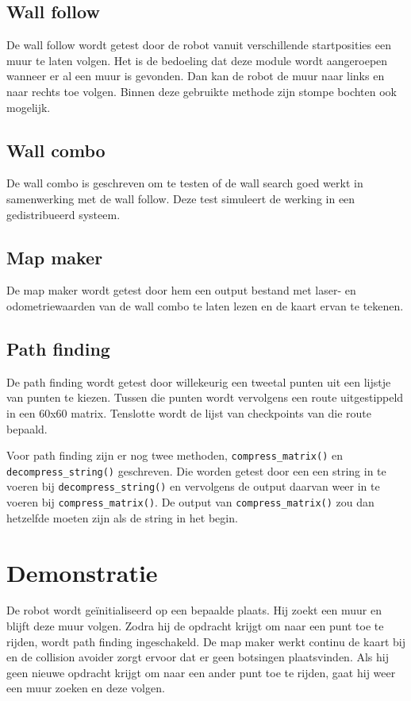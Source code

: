 \documentclass[a4paper,10pt]{article}
\begin{document}
\subsection{Wall follow}
De wall follow wordt getest door de robot vanuit verschillende startposities een muur te laten volgen. Het is de bedoeling dat deze module wordt aangeroepen wanneer er al een muur is gevonden. Dan kan de robot de muur naar links en naar rechts toe volgen. Binnen deze gebruikte methode zijn stompe bochten ook mogelijk.

\subsection{Wall combo}
De wall combo is geschreven om te testen of de wall search goed werkt in samenwerking met de wall follow. Deze test simuleert
de werking in een gedistribueerd systeem.

\subsection{Map maker}
De map maker wordt getest door hem een output bestand met laser- en odometriewaarden van de wall combo te laten lezen en de kaart ervan te tekenen.

\subsection{Path finding}
De path finding wordt getest door willekeurig een tweetal punten uit een lijstje van punten te kiezen. Tussen die punten wordt vervolgens een route uitgestippeld in een 60x60 matrix. Tenslotte wordt de lijst van checkpoints van die route bepaald.

Voor path finding zijn er nog twee methoden, \verb!compress_matrix()! en\\ \verb!decompress_string()! geschreven. Die worden getest door een een string in te voeren bij \verb!decompress_string()! en vervolgens de output daarvan weer in te voeren bij \verb!compress_matrix()!. De output van \verb!compress_matrix()! zou dan hetzelfde moeten zijn als de string in het begin.

\section{Demonstratie}
De robot wordt ge\"{i}nitialiseerd op een bepaalde plaats. Hij zoekt een muur en blijft deze muur volgen. Zodra hij de opdracht krijgt om naar een punt toe te rijden, wordt path finding ingeschakeld. De map maker werkt continu de kaart bij en de collision avoider zorgt ervoor dat er geen botsingen plaatsvinden. Als hij geen nieuwe opdracht krijgt om naar een ander punt toe te rijden, gaat hij weer een muur zoeken en deze volgen.
\end{document}
